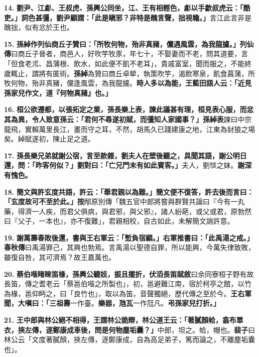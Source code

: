\textbf{14.} \textbf{劉尹、江虨、王叔虎、孫興公同坐，江、王有相輕色，虨以手歙叔虎云：「酷吏。」詞色甚彊，劉尹顧謂：「此是瞋邪？非特是醜言聲，拙視瞻。」}{\footnotesize 言江此言非是醜拙，似有忿於王也。}

\textbf{15.} \textbf{孫綽作列仙商丘子贊曰：「所牧何物，殆非真豬，儻遇風雲，為我龍攄。」}{\footnotesize \textbf{列仙傳}曰商丘子晉者，商邑人，好吹竽牧豕，年七十，不娶妻而不老，問其道要，言「但食老朮、昌蒲根、飲水，如此便不飢不老耳」，貴戚富室，聞而服之，不能終歲輒止，謂將有匿術。\textbf{孫綽}為贊曰商丘卓犖，執策吹竽，渴飲寒泉，飢食菖蒲，所牧何物，殆非真豬，儻逢風雲，為我龍攄。}\textbf{時人多以為能，王藍田語人云：「近見孫家兒作文，道『何物真豬』也。」}

\textbf{16.} \textbf{桓公欲遷都，以張拓定之業，孫長樂上表，諫此議甚有理，桓見表心服，而忿其為異，令人致意孫云：「君何不尋遂初賦，而彊知人家國事？」}{\footnotesize \textbf{孫綽表}諫曰中宗龍飛，實賴萬里長江，畫而守之耳，不然，胡馬久已踐建康之地，江東為豺狼之場矣。綽賦遂初，陳止足之道。}

\textbf{17.} \textbf{孫長樂兄弟就謝公宿，言至款雜，劉夫人在壁後聽之，具聞其語，謝公明日還，問：「昨客何似？」劉對曰：「亡兄門未有如此賓客。」}{\footnotesize 夫人，劉惔之妹。}\textbf{謝深有愧色。}

\textbf{18.} \textbf{簡文與許玄度共語，許云：「舉君親以為難。」簡文便不復答，許去後而言曰：「玄度故可不至於此。」}{\footnotesize \textbf{按}邴原別傳「魏五官中郎將嘗與群賢共論曰『今有一丸藥，得濟一人疾，而君父俱病，與君邪，與父邪』，諸人紛葩，或父或君，原勃然曰『父子，一本也』，亦不復難」，君親相校，自古如此，未解簡文誚許意。}

\textbf{19.} \textbf{謝萬壽春敗後還，書與王右軍云：「慙負宿顧。」右軍推書曰：「此禹湯之戒。」}{\footnotesize \textbf{春秋傳}曰禹湯罪己，其興也勃焉。言禹湯以聖德自罪，所以能興，今萬失律致敗，雖復自咎，其可濟焉？故王嘉萬也。}

\textbf{20.} \textbf{蔡伯喈睹睞笛椽，孫興公聽妓，振且擺折，}{\footnotesize \textbf{伏滔長笛賦敘}曰余同寮桓子野有故長笛，傳之耆老云「蔡邕伯喈之所製也」，初，邕避難江南，宿於柯亭之館，以竹為椽，邕仰眄之，曰「良竹也」，取以為笛，音聲獨絕，歷代傳之至於今。}\textbf{王右軍聞，大嗔曰：「三祖壽}{\footnotesize 一作臺。}\textbf{樂器，虺瓦}{\footnotesize 一作尫凡。}\textbf{弔孫家兒打折。」}

\textbf{21.} \textbf{王中郎與林公絕不相得，王謂林公詭辯，林公道王云：「著膩顏帢，翕布單衣，挾左傳，逐鄭康成車後，問是何物塵垢囊？」}{\footnotesize 中郎，坦之。帢，帽也。\textbf{裴子}曰林公云「文度著膩顏，挾左傳，逐鄭康成，自為高足弟子，篤而論之，不離塵垢囊也」。}

